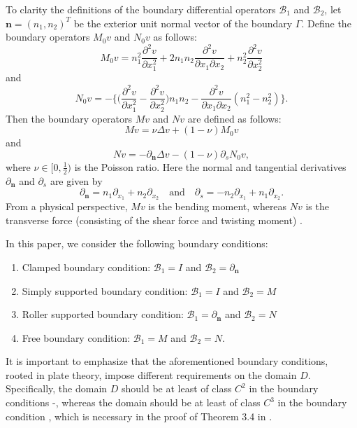 \documentclass[10pt,a4paper]{article}
\numberwithin{equation}{section}
\begin{document}
To clarity the definitions of the boundary differential operators $\mathcal{B}_1$
and $\mathcal{B}_2$, let $\bm{ n }=(n_1,n_2)^T$ be the exterior unit normal vector of the boundary $\Gamma$. Define the boundary operators  $M_0v$ and $N_0v$ as follows:
\begin{equation*}
  M_0v = n_1^2 \dfrac{\partial^2 v }{\partial x_1^2} + 2n_1n_2 \dfrac{\partial^2v }{\partial x_1\partial x_2}
          + n_2^2 \dfrac{\partial^2 v }{\partial x_2^2}
\end{equation*}
and
\begin{equation*}
  N_0v = -\Big\{  \big( \dfrac{\partial^2 v }{\partial x_1^2}-  \dfrac{\partial^2 v }{\partial x_2^2} \big)n_1n_2  - \dfrac{\partial^2v }{\partial x_1\partial x_2}(n_1^2 - n_2^2)
          \Big\}.
\end{equation*}
Then the boundary operators $Mv$ and $Nv$ are defined as follows:
\begin{equation*}
M v = \nu \Delta v + (1-\nu) M_0 v
\end{equation*}
and
\begin{equation*}
N v = -\partial_{\bm{n} }\Delta v - (1-\nu) \partial_sN_0 v,
\end{equation*}
where $\nu\in[0,\frac{1}{2})$ is the Poisson ratio.
Here the normal and tangential derivatives $\partial_{\bm{n} }$  and $\partial_s$ are given by
\begin{equation*}
  \partial_{\bm{n} } = n_1\partial_{x_1} + n_2\partial_{x_2} \quad
  \mathrm{ and } \quad
  \partial_s=  -n_2\partial_{x_1}  + n_1\partial_{x_2}.
\end{equation*}
From a physical perspective, $Mv$ is the bending moment, whereas $Nv$ is the transverse force (consisting of the shear force and twisting moment) \cite{chen_boundary_2010}.

In this paper, we consider the following boundary conditions:
\begin{enumerate}
\item Clamped boundary condition: $\mathcal{B}_1=I$ and $\mathcal{B}_2=\partial_{\bm{n} }$
\item Simply supported boundary condition: $\mathcal{B}_1=I$ and $\mathcal{B}_2=M$
\item Roller supported boundary condition: $\mathcal{B}_1=\partial_{\bm{n}}$ and $ \mathcal{B}_2=N$
\item Free boundary condition: $\mathcal{B}_1=M$ and $ \mathcal{B}_2=N$.
 \end{enumerate}
It is important to emphasize that the aforementioned boundary conditions, rooted in plate theory, impose different requirements on the domain $D$. Specifically, the domain $D$ should be at least of class $C^2$ in the boundary conditions \uppercase\expandafter{}-\uppercase\expandafter{}, whereas the domain should be at least of class $C^3$ in the boundary condition \uppercase\expandafter{}, which is necessary in the proof of Theorem 3.4 in \cite{bourgeois_well_2020}.
 
\end{document}
